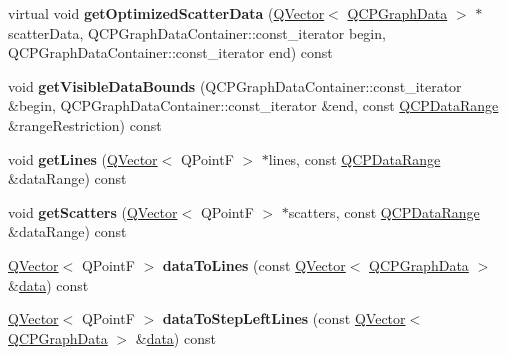 \begin{DoxyCompactItemize}
\item 
virtual void {\bfseries get\+Optimized\+Scatter\+Data} (\hyperlink{class_q_vector}{Q\+Vector}$<$ \hyperlink{class_q_c_p_graph_data}{Q\+C\+P\+Graph\+Data} $>$ $\ast$scatter\+Data, Q\+C\+P\+Graph\+Data\+Container\+::const\+\_\+iterator begin, Q\+C\+P\+Graph\+Data\+Container\+::const\+\_\+iterator end) const \hypertarget{class_q_c_p_graph_aa724dc436acf048a390609e2153fb36e}{}\label{class_q_c_p_graph_aa724dc436acf048a390609e2153fb36e}

\item 
void {\bfseries get\+Visible\+Data\+Bounds} (Q\+C\+P\+Graph\+Data\+Container\+::const\+\_\+iterator \&begin, Q\+C\+P\+Graph\+Data\+Container\+::const\+\_\+iterator \&end, const \hyperlink{class_q_c_p_data_range}{Q\+C\+P\+Data\+Range} \&range\+Restriction) const \hypertarget{class_q_c_p_graph_a687d370a9fbe8d4345dd6387870a198d}{}\label{class_q_c_p_graph_a687d370a9fbe8d4345dd6387870a198d}

\item 
void {\bfseries get\+Lines} (\hyperlink{class_q_vector}{Q\+Vector}$<$ Q\+PointF $>$ $\ast$lines, const \hyperlink{class_q_c_p_data_range}{Q\+C\+P\+Data\+Range} \&data\+Range) const \hypertarget{class_q_c_p_graph_a4827cc8402023cceec56bc2e59915565}{}\label{class_q_c_p_graph_a4827cc8402023cceec56bc2e59915565}

\item 
void {\bfseries get\+Scatters} (\hyperlink{class_q_vector}{Q\+Vector}$<$ Q\+PointF $>$ $\ast$scatters, const \hyperlink{class_q_c_p_data_range}{Q\+C\+P\+Data\+Range} \&data\+Range) const \hypertarget{class_q_c_p_graph_affcf992b16846f43f55500c910d197c8}{}\label{class_q_c_p_graph_affcf992b16846f43f55500c910d197c8}

\item 
\hyperlink{class_q_vector}{Q\+Vector}$<$ Q\+PointF $>$ {\bfseries data\+To\+Lines} (const \hyperlink{class_q_vector}{Q\+Vector}$<$ \hyperlink{class_q_c_p_graph_data}{Q\+C\+P\+Graph\+Data} $>$ \&\hyperlink{class_q_c_p_graph_a04514a2b1fb61a280ead66abe80b89ab}{data}) const \hypertarget{class_q_c_p_graph_aba5f6fe725d647e215594d857c002c89}{}\label{class_q_c_p_graph_aba5f6fe725d647e215594d857c002c89}

\item 
\hyperlink{class_q_vector}{Q\+Vector}$<$ Q\+PointF $>$ {\bfseries data\+To\+Step\+Left\+Lines} (const \hyperlink{class_q_vector}{Q\+Vector}$<$ \hyperlink{class_q_c_p_graph_data}{Q\+C\+P\+Graph\+Data} $>$ \&\hyperlink{class_q_c_p_graph_a04514a2b1fb61a280ead66abe80b89ab}{data}) const \hypertarget{class_q_c_p_graph_ae8574394b76c73d2853f45732bb9188e}{}\label{class_q_c_p_graph_ae8574394b76c73d2853f45732bb9188e}


\end{DoxyCompactItemize}
